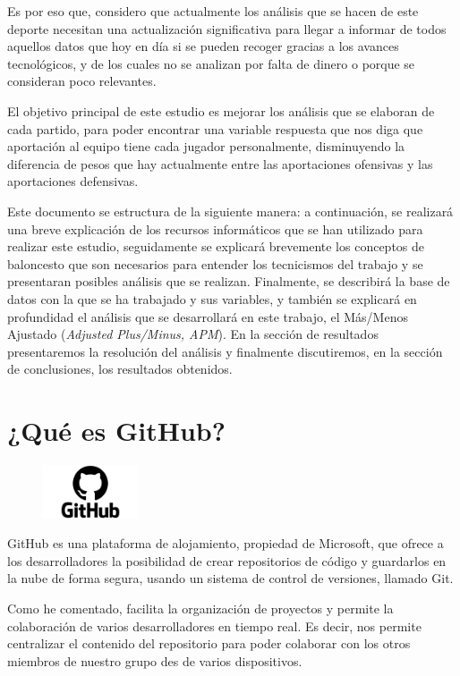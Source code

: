\documentclass[paper=a4, fontsize=9pt]{article}
\begin{document}
Es por eso que, considero que actualmente los análisis que se hacen de este deporte necesitan una actualización significativa para llegar a informar de todos aquellos datos que hoy en día si se pueden recoger gracias a los avances tecnológicos, y de los cuales no se analizan por falta de dinero o porque se consideran poco relevantes.

El objetivo principal de este estudio es mejorar los análisis que se elaboran de cada partido, para poder encontrar una variable respuesta que nos diga que aportación al equipo tiene cada jugador personalmente, disminuyendo la diferencia de pesos que hay actualmente entre las aportaciones ofensivas y las aportaciones defensivas.

Este documento se estructura de la siguiente manera: a continuación, se realizará una breve explicación de los recursos informáticos que se han utilizado para realizar este estudio, seguidamente se explicará brevemente los conceptos de baloncesto que son necesarios para entender los tecnicismos del trabajo y se presentaran posibles análisis que se realizan. Finalmente, se describirá la base de datos con la que se ha trabajado y sus variables, y también se explicará en profundidad el análisis que se desarrollará en este trabajo, el Más/Menos Ajustado (\emph{Adjusted Plus/Minus, APM}). En la sección de resultados presentaremos la resolución del análisis y finalmente discutiremos, en la sección de conclusiones, los resultados obtenidos.

\section{¿Qué es GitHub?}

\begin{figure} %
    \centering
    \includegraphics[width=0.25\textwidth]{imagenes/GitHub-Logo.png}
\end{figure}

GitHub es una plataforma de alojamiento, propiedad de Microsoft, que ofrece a los desarrolladores la posibilidad de crear repositorios de código y guardarlos en la nube de forma segura, usando un sistema de control de versiones, llamado Git.

Como he comentado, facilita la organización de proyectos y permite la colaboración de varios desarrolladores en tiempo real. Es decir, nos permite centralizar el contenido del repositorio para poder colaborar con los otros miembros de nuestro grupo des de varios dispositivos.
\end{document}
